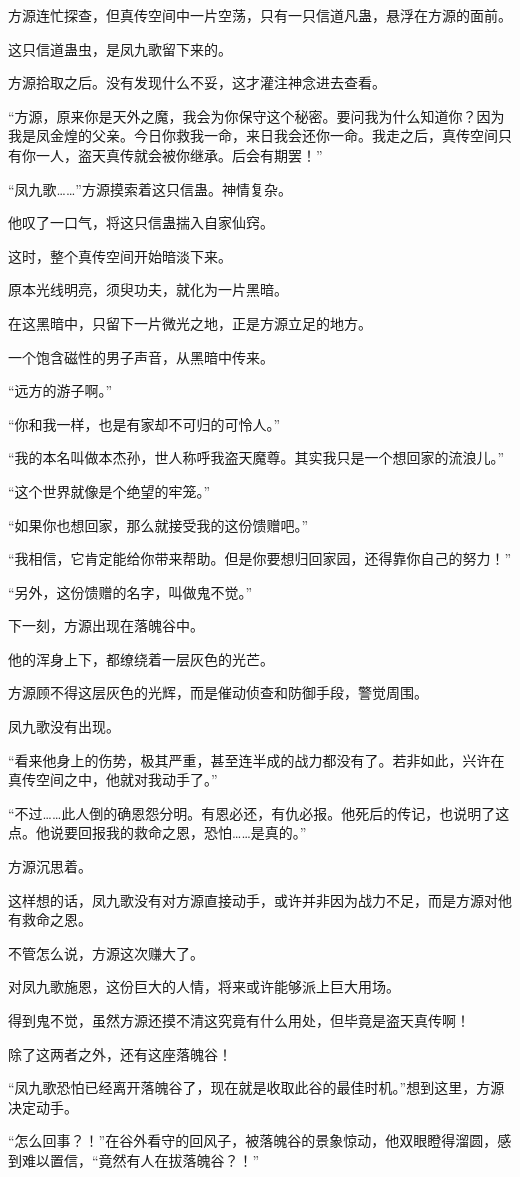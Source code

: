 \begin{this_body}
方源连忙探查，但真传空间中一片空荡，只有一只信道凡蛊，悬浮在方源的面前。

这只信道蛊虫，是凤九歌留下来的。

方源拾取之后。没有发现什么不妥，这才灌注神念进去查看。

“方源，原来你是天外之魔，我会为你保守这个秘密。要问我为什么知道你？因为我是凤金煌的父亲。今日你救我一命，来日我会还你一命。我走之后，真传空间只有你一人，盗天真传就会被你继承。后会有期罢！”

“凤九歌……”方源摸索着这只信蛊。神情复杂。

他叹了一口气，将这只信蛊揣入自家仙窍。

这时，整个真传空间开始暗淡下来。

原本光线明亮，须臾功夫，就化为一片黑暗。

在这黑暗中，只留下一片微光之地，正是方源立足的地方。

一个饱含磁性的男子声音，从黑暗中传来。

“远方的游子啊。”

“你和我一样，也是有家却不可归的可怜人。”

“我的本名叫做本杰孙，世人称呼我盗天魔尊。其实我只是一个想回家的流浪儿。”

“这个世界就像是个绝望的牢笼。”

“如果你也想回家，那么就接受我的这份馈赠吧。”

“我相信，它肯定能给你带来帮助。但是你要想归回家园，还得靠你自己的努力！”

“另外，这份馈赠的名字，叫做鬼不觉。”

下一刻，方源出现在落魄谷中。

他的浑身上下，都缭绕着一层灰色的光芒。

方源顾不得这层灰色的光辉，而是催动侦查和防御手段，警觉周围。

凤九歌没有出现。

“看来他身上的伤势，极其严重，甚至连半成的战力都没有了。若非如此，兴许在真传空间之中，他就对我动手了。”

“不过……此人倒的确恩怨分明。有恩必还，有仇必报。他死后的传记，也说明了这点。他说要回报我的救命之恩，恐怕……是真的。”

方源沉思着。

这样想的话，凤九歌没有对方源直接动手，或许并非因为战力不足，而是方源对他有救命之恩。

不管怎么说，方源这次赚大了。

对凤九歌施恩，这份巨大的人情，将来或许能够派上巨大用场。

得到鬼不觉，虽然方源还摸不清这究竟有什么用处，但毕竟是盗天真传啊！

除了这两者之外，还有这座落魄谷！

“凤九歌恐怕已经离开落魄谷了，现在就是收取此谷的最佳时机。”想到这里，方源决定动手。

“怎么回事？！”在谷外看守的回风子，被落魄谷的景象惊动，他双眼瞪得溜圆，感到难以置信，“竟然有人在拔落魄谷？！”

\end{this_body}

